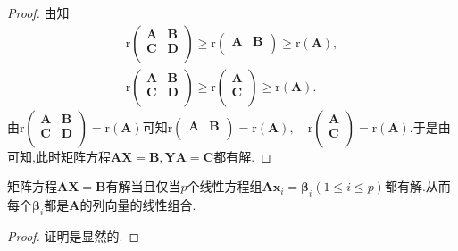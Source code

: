\documentclass[../../main.tex]{subfiles}
\begin{document}
\begin{proof}
由知
\begin{gather*}
\mathrm{r}\left( \begin{matrix}
\boldsymbol{A}&		\boldsymbol{B}\\
\boldsymbol{C}&		\boldsymbol{D}\\
\end{matrix} \right) \geqslant \mathrm{r}\left( \begin{matrix}
\boldsymbol{A}&		\boldsymbol{B}\\
\end{matrix} \right) \geqslant \mathrm{r}\left( \boldsymbol{A} \right) ,
\\
\mathrm{r}\left( \begin{matrix}
\boldsymbol{A}&		\boldsymbol{B}\\
\boldsymbol{C}&		\boldsymbol{D}\\
\end{matrix} \right) \geqslant \mathrm{r}\left( \begin{array}{c}
\boldsymbol{A}\\
\boldsymbol{C}\\
\end{array} \right) \geqslant \mathrm{r}\left( \boldsymbol{A} \right) .
\end{gather*}
由$\mathrm{r}\left( \begin{matrix}
\boldsymbol{A}&		\boldsymbol{B}\\
\boldsymbol{C}&		\boldsymbol{D}\\
\end{matrix} \right) =\mathrm{r}\left( \boldsymbol{A} \right)$可知$\mathrm{r}\left( \begin{matrix}
\boldsymbol{A}&		\boldsymbol{B}\\
\end{matrix} \right) =\mathrm{r}\left( \boldsymbol{A} \right) ,\quad \mathrm{r}\left( \begin{array}{c}
\boldsymbol{A}\\
\boldsymbol{C}\\
\end{array} \right) =\mathrm{r}\left( \boldsymbol{A} \right).$于是由可知,此时矩阵方程\(\boldsymbol{AX}=\boldsymbol{B},\boldsymbol{YA}=\boldsymbol{C}\)都有解.
\end{proof}

\begin{proposition}
矩阵方程\(\boldsymbol{A}\boldsymbol{X}=\boldsymbol{B}\)有解当且仅当\(p\)个线性方程组\(\boldsymbol{A}\boldsymbol{x}_i=\boldsymbol{\beta}_i(1\leqslant  i\leqslant  p)\)都有解.从而每个\(\boldsymbol{\beta}_i\)都是\(\boldsymbol{A}\)的列向量的线性组合.
\end{proposition}
\begin{proof}
证明是显然的.
\end{proof}
\end{document}

